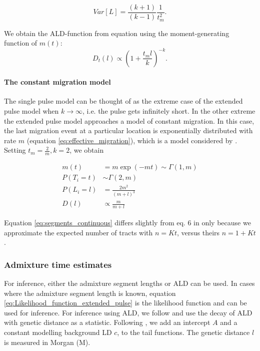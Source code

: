 \documentclass[11pt]{article}
\let\oldparagraph\paragraph
\renewcommand{\paragraph}[1]{\oldparagraph{#1}\mbox{}}
\begin{document}

\begin{equation}
\label{eq:Var_l_extended_pulse}
	Var[L] = \frac{(k+1)}{(k-1)} \frac{1}{t_m^2}\text{.}
\end{equation}
	
We obtain the ALD-function from equation \label{eq:ld_general} using the  moment-generating function of $m(t)$:
\begin{equation}
\label{eq:extended_pulse_tail}
D_t(l) \propto  \left( 1 + \frac{t_m l}{k}\right)^{-k} \text{.}
\end{equation}

	
\paragraph{The constant migration model}

The single pulse model can be thought of as the extreme case of the extended pulse model when $k \to \infty$, i.e. the pulse gets infinitely short. In the  other extreme the extended pulse model approaches a model of constant migration. In this case, the last migration event at a particular location is exponentially distributed with rate $m$ (equation \ref{eq:effective_migration}), which is a model considered by \cite{pool_inference_2009}. 
Setting $t_m = \frac{2}{m}, k=2$, we obtain

\begin{subequations}
\begin{align}
    m(t) &= m \exp(-mt) \sim \Gamma(1, m)\\
    P(T_i=t) &\sim \Gamma\left(2, m\right)\\
	P(L_i=l) &= \frac{2m^2}{(m+l)^3}\label{eq:segments_continuous}\\
	D(l) &\propto \frac{m}{m + l}
\end{align}
\end{subequations}
	
Equation \ref{eq:segments_continuous} differs slightly from eq. 6 in \cite{pool_inference_2009} only because we approximate the expected number of tracts with $n=Kt$, versus theirs $n=1+Kt$. 
	





\subsubsection{Admixture time estimates}\label{admixture time estimates}
For inference, either the admixture segment lengths or ALD can be used. In cases where the admixture segment length is known, equation \ref{eq:Likelihood_function_extended_pulse} is the likelihood function and can be used for inference. For inference using ALD,  we follow \cite{moorjani_history_2011} and use the decay of ALD with genetic distance as a statistic. Following \cite{moorjani_genetic_2016}, we add an intercept $A$ and a constant modelling background LD $c$, to the tail functions. The genetic distance $l$ is measured in Morgan (M). 
\end{document}

